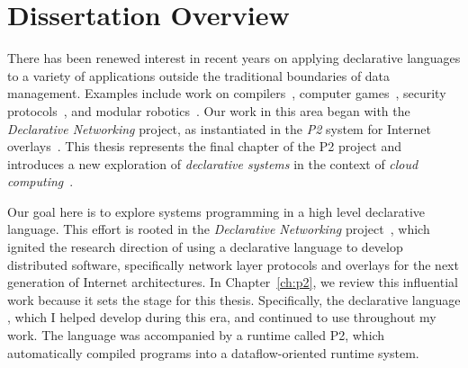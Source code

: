 \chapter[Dissertation Overview]{Dissertation Overview}
\label{ch:overview}

There has been renewed interest in recent years on applying declarative
languages to a variety of applications outside the traditional boundaries of
data management.  Examples include work on compilers~\cite{lam05context},
computer games~\cite{white-sigmod07}, security protocols~\cite{li-padl03}, and
modular robotics~\cite{ashley-iros07}.  Our work in this area began with the
{\em Declarative Networking} project, as instantiated in the {\em P2} system
for Internet overlays~\cite{p2:sosp, loo-sigmod06}.  This thesis represents the
final chapter of the P2 project and introduces a new exploration of {\em
declarative systems} in the context of {\em cloud
computing}~\cite{abovetheclouds}.


Our goal here is to explore systems programming in a high level declarative
language.  This effort is rooted in the {\em Declarative Networking}
project~\cite{boon-thesis}, which ignited the research direction of using a
declarative language to develop distributed software, specifically network
layer protocols and overlays for the next generation of Internet architectures.
In Chapter~\ref{ch:p2}, we review this influential work because it sets the
stage for this thesis.  Specifically, the declarative language \OVERLOG, which
I helped develop during this era, and continued to use throughout my work.  The
\OVERLOG language was accompanied by a runtime called P2, which automatically
compiled \OVERLOG programs into a dataflow-oriented runtime system.

